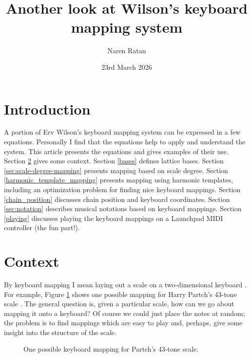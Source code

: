 \documentclass[a4paper,11pt]{article}
\begin{document}
\title{
\vspace{-2.5cm}
Another look at Wilson's keyboard mapping system
\vspace{-0.5cm}
}
\author{\vspace{-0.5cm}Naren Ratan}
\date{\vspace{-0.5cm}23rd March 2026\vspace{-1cm}}
\maketitle
\section{Introduction}
A portion of Erv Wilson's keyboard mapping system can be expressed in a few
equations. Personally I find that the equations help to apply and understand
the system. This article presents the equations and gives examples of their
use. Section \ref{context} gives some context. Section \ref{bases} defines
lattice bases. Section \ref{sec:scale-degree-mapping} presents mapping based on
scale degree. Section \ref{harmonic_template_mapping} presents mapping using
harmonic templates, including an optimization problem for finding nice keyboard
mappings. Section \ref{chain_position} discusses chain position and keyboard
coordinates. Section \ref{sec:notation} describes musical notations based on
keyboard mappings. Section \ref{playing} discusses playing the keyboard
mappings on a Launchpad MIDI controller (the fun part!).

\section{Context}
\label{context}
By keyboard mapping I mean laying out a scale on a two-dimensional keyboard
\cite{narushima2017microtonality}. For example, Figure \ref{fig:partch-example}
shows one possible mapping for Harry Partch's 43-tone scale
\cite{partch1979genesis}. The general question is, given a particular scale,
how can we go about mapping it onto a keyboard?  Of course we could just place
the notes at random; the problem is to find mappings which are easy to play
and, perhaps, give some insight into the structure of the scale.

\begin{figure}[h]
\vspace{0.35cm}
\begin{center}

\end{center}
\caption{One possible keyboard mapping for Partch's 43-tone scale.}
\label{fig:partch-example}
\end{figure}
\end{document}
